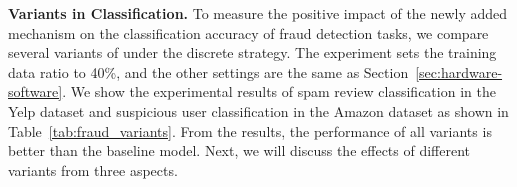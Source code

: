 \begin{table}[t]
    \setlength{\abovecaptionskip}{0.cm}
    \setlength{\belowcaptionskip}{-0.cm}
    \caption{Fraud Detection classification results () compared to \RioGNN variants.}\label{tab:fraud_variants}
    \centering
\end{table}



\textbf{\RioGNN Variants in Classification. }
To measure the positive impact of the newly added mechanism on the classification accuracy of fraud detection tasks, we compare several variants of \RioGNN under the discrete strategy.
The experiment sets the training data ratio to 40\%, and the other settings are the same as Section~\ref{sec:hardware-software}.
We show the experimental results of spam review classification in the Yelp dataset and suspicious user classification in the Amazon dataset as shown in Table~\ref{tab:fraud_variants}.
From the results, the performance of all variants is better than the baseline model. Next, we will discuss the effects of different variants from three aspects.


